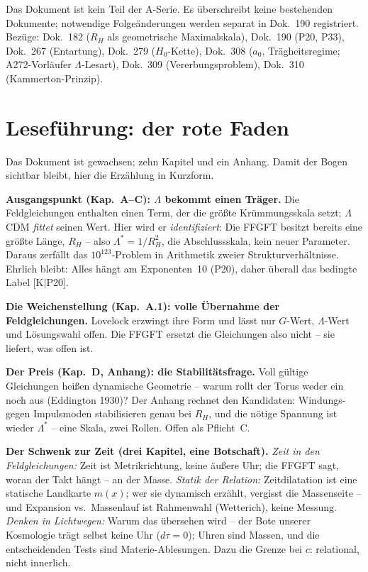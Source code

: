 Das Dokument ist kein Teil der A-Serie. Es überschreibt keine
bestehenden Dokumente; notwendige Folgeänderungen werden separat
in Dok.~190 registriert.
Bezüge: Dok.~182 ($R_H$ als geometrische Maximalskala),
Dok.~190 (P20, P33), Dok.~267 (Entartung), Dok.~279 ($H_0$-Kette),
Dok.~308 ($a_0$, Trägheitsregime; A272-Vorläufer $\Lambda$-Lesart),
Dok.~309 (Vererbungsproblem), Dok.~310 (Kammerton-Prinzip).

\section*{Leseführung: der rote Faden}

Das Dokument ist gewachsen; zehn Kapitel und ein Anhang. Damit der
Bogen sichtbar bleibt, hier die Erzählung in Kurzform.

\textbf{Ausgangspunkt (Kap.~A--C): $\Lambda$ bekommt einen
Träger.} Die Feldgleichungen enthalten einen Term, der die größte
Krümmungsskala setzt; $\Lambda$CDM \emph{fittet} seinen Wert. Hier
wird er \emph{identifiziert}: Die FFGFT besitzt bereits eine größte
Länge, $R_H$ -- also $\Lambda^{*} = 1/R_H^2$, die Abschlussskala,
kein neuer Parameter. Daraus zerfällt das $10^{123}$-Problem in
Arithmetik zweier Strukturverhältnisse. Ehrlich bleibt: Alles hängt
am Exponenten~10 (P20), daher überall das bedingte Label [K$|$P20].

\textbf{Die Weichenstellung (Kap.~A.1): volle Übernahme der
Feldgleichungen.} Lovelock erzwingt ihre Form und lässt nur
$G$-Wert, $\Lambda$-Wert und Lösungswahl offen. Die FFGFT ersetzt
die Gleichungen also nicht -- sie liefert, was offen ist.

\textbf{Der Preis (Kap.~D, Anhang): die Stabilitätsfrage.} Voll
gültige Gleichungen heißen dynamische Geometrie -- warum rollt der
Torus weder ein noch aus (Eddington 1930)? Der Anhang rechnet den
Kandidaten: Windungs- gegen Impulsmoden stabilisieren genau bei
$R_H$, und die nötige Spannung ist wieder $\Lambda^{*}$ -- eine
Skala, zwei Rollen. Offen als Pflicht~C.

\textbf{Der Schwenk zur Zeit (drei Kapitel, eine Botschaft).}
\emph{Zeit in den Feldgleichungen:} Zeit ist Metrikrichtung, keine
äußere Uhr; die FFGFT sagt, woran der Takt hängt -- an der Masse.
\emph{Statik der Relation:} Zeitdilatation ist eine statische
Landkarte $m(x)$; wer sie dynamisch erzählt, vergisst die
Massenseite -- und Expansion vs.\ Massenlauf ist Rahmenwahl
(Wetterich), keine Messung. \emph{Denken in Lichtwegen:} Warum das
übersehen wird -- der Bote unserer Kosmologie trägt selbst keine
Uhr ($d\tau = 0$); Uhren sind Massen, und die entscheidenden Tests
sind Materie-Ablesungen. Dazu die Grenze bei $c$: relational, nicht
innerlich.

